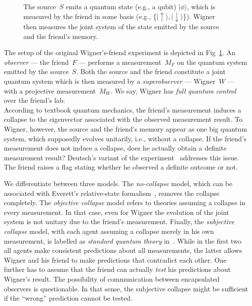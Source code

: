 \documentclass[aps,pra,twocolumn]{revtex4-1}
\newcommand{\ket}[1]{|#1 \rangle}
\newcommand{\da}{\downarrow}
\newcommand{\ua}{\uparrow}
\theoremstyle{definition}
\theoremstyle{remark}
\begin{document}
\begin{figure}
\centering
{}
\caption{The source~$S$ emits a quantum state (e.g., a qubit) $\ket{\phi}$, which is measured by the friend in some basis (e.g., \{$\ket{\ua}, \ket{\da}$\}). Wigner then measures the joint system of the state emitted by the source and the friend's memory.}
\label{fig:Wigner}
\end{figure}
The setup of the original Wigner's-friend experiment is depicted in Fig~\ref{fig:Wigner}.
An \emph{observer} --- the friend~$F$ --- performs a measurement~$M_F$ on the quantum system emitted by the source~$S$.
Both the source and the friend constitute a joint quantum system which is then measured by a \emph{superobserver} --- Wigner~$W$ --- with a projective measurement~$M_W$.
We say, Wigner has \emph{full quantum control} over the friend's lab.\\
According to textbook quantum mechanics, the friend's measurement induces a collapse to the eigenvector associated with the observed measurement result.
To Wigner, however, the source and the friend's memory appear as one big quantum system, which supposedly evolves unitarily, i.e., without a collapse.
If the friend's measurement does not induce a collapse, does he actually obtain a definite measurement result?
Deutsch's variant of the experiment~\cite{deutsch1985quantum} addresses this issue. 
The friend raises a flag stating whether he observed a definite outcome or not.

We differentiate between three models. 
The \emph{no-collapse} model, which can be associated with Everett's relative-state formalism~\cite{everett1957relative}, removes the collapse completely.
The \emph{objective collapse} model refers to theories assuming a collapse in every measurement. 
In that case, even for Wigner the evolution of the joint system is not unitary due to the friend's measurement.
Finally, the \emph{subjective collapse} model, with each agent assuming a collapse merely in his own measurement, is labelled as \emph{standard quantum theory} in~\cite{FrRen}.  
While in the first two all agents make consistent predictions about all measurements, the latter allows Wigner and his friend to make predictions that contradict each other.
One further has to assume that the friend can actually \emph{test} his predictions about Wigner's result.
The possibility of communication between encapsulated observers is questionable.
In that sense, the subjective collapse might be sufficient if the ``wrong'' prediction cannot be tested.
\end{document}
